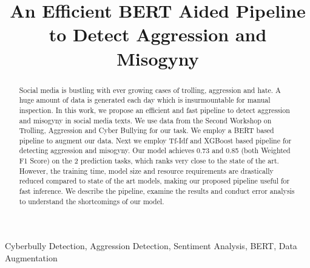 \documentclass[conference]{IEEEtran}
\begin{document}
\title{An Efficient BERT Aided Pipeline to Detect Aggression and Misogyny}
\author{
\and
{}
\and
{}
}
\maketitle
\begin{abstract}
    Social media is bustling with ever growing cases of trolling, aggression and hate. A huge amount of data is generated each day which is insurmountable for manual inspection. In this work, we propose an efficient and fast pipeline to detect aggression and misogyny in social media texts. We use data from the Second Workshop on Trolling, Aggression and Cyber Bullying for our task. We employ a BERT based pipeline to augment our data. Next we employ Tf-Idf and XGBoost based pipeline for detecting aggression and misogyny. Our model achieves 0.73 and 0.85 (both Weighted F1 Score) on the 2 prediction tasks, which ranks very close to the state of the art. However, the training time, model size and resource requirements are drastically reduced compared to state of the art models, making our proposed pipeline useful for fast inference. We describe the pipeline, examine the results and conduct error analysis to understand the shortcomings of our model.
\end{abstract}
\begin{IEEEkeywords}
Cyberbully Detection, Aggression Detection, Sentiment Analysis, BERT, Data Augmentation
\end{IEEEkeywords}
\end{document}
